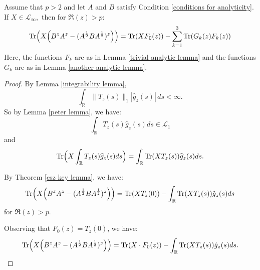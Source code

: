     \begin{lem}\label{splitting lemma} 
        Assume that $p>2$ and let $A$ and $B$ satisfy Condition \ref{conditions for analyticity}. If $X\in\mathcal{L}_{\infty},$ then for $\Re(z) > p$:
        $${\rm Tr}\Big(X\Big(B^zA^z-(A^{\frac12}BA^{\frac12})^z\Big)\Big)={\rm Tr}(XF_0(z))-\sum_{k=1}^3{\rm Tr}(G_k(z)F_k(z))$$
        Here, the functions $F_k$ are as in Lemma \ref{trivial analytic lemma} and the functions $G_k$ are as in Lemma \ref{another analytic lemma}.
    \end{lem}
    \begin{proof} 
        {By Lemma \ref{integrability lemma},
        \begin{equation*}
            \int_{\mathbb{R}} \|T_z(s)\|_1|\widehat{g}_z(s)|\,ds < \infty.
        \end{equation*}}
        So by Lemma \ref{peter lemma}, we have:
        $$\int_{\mathbb{R}}T_z(s)\widehat{g}_z(s)ds\in\mathcal{L}_1$$
        and
        $${\rm Tr}\Big(X\int_{\mathbb{R}}T_z(s)\widehat{g}_z(s)ds\Big)=\int_{\mathbb{R}}{\rm Tr}(XT_z(s))\widehat{g}_z(s)ds.$$
                
        By Theorem \ref{csz key lemma}, we have:
        \begin{equation}
            {\rm Tr}\Big(X\Big(B^zA^z-(A^{\frac12}BA^{\frac12})^z\Big)\Big) = {\rm Tr}(XT_z(0))-\int_{\mathbb{R}}{\rm Tr}(XT_z(s))\hat{g}_z(s)ds
        \end{equation}
        for $\Re(z)>p.$ 
        
        Observing that $F_0(z) = T_z(0)$, we have:
        \begin{equation}\label{csz with traces}
            {\rm Tr}\Big(X\Big(B^zA^z-(A^{\frac12}BA^{\frac12})^z\Big)\Big) = {\rm Tr}(X\cdot F_0(z))-\int_{\mathbb{R}}{\rm Tr}(XT_z(s))\hat{g}_z(s)ds.
        \end{equation}


\end{proof}
